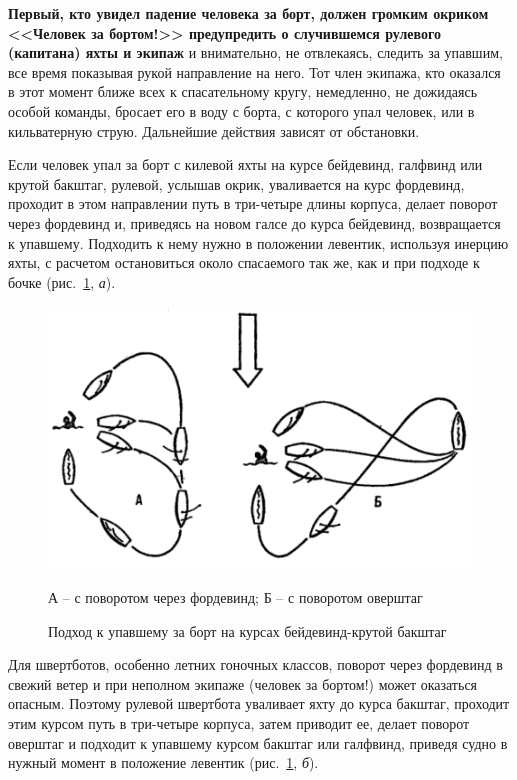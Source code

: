 \documentclass[a4paper, 12pt, twoside, final]{scrbook}
\begin{document}
\textbf{Первый, кто увидел падение человека за борт, должен громким окриком <<Человек за бортом!>> предупредить о случившемся рулевого (капитана) яхты и экипаж} и внимательно, не отвлекаясь, следить за упавшим, все время показывая рукой направление на него. Тот член экипажа, кто оказался в этот момент ближе всех к спасательному кругу, немедленно, не дожидаясь особой команды, бросает его в воду с борта, с которого упал человек, или в кильватерную струю. Дальнейшие действия зависят от обстановки.

Если человек упал за борт с килевой яхты на курсе бейдевинд, галфвинд или крутой бакштаг, рулевой, услышав окрик, уваливается на курс фордевинд, проходит в этом направлении путь в три\--четыре длины корпуса, делает поворот через фордевинд и, приведясь на новом галсе до курса бейдевинд, возвращается к упавшему. Подходить к нему нужно в положении левентик, используя инерцию яхты, с расчетом остановиться около спасаемого так же, как и при подходе к бочке (рис.~\ref{fig:134}, \textit{а}). 

\begin{figure}[htbp]
   \centering
   \includegraphics{pics/134_Podhod_upavshemu_za_bort} %
   \caption{Подход к упавшему за борт на курсах бейдевинд\--крутой бакштаг}
   \label{fig:134}
   \centering\small
   А \--- с поворотом через фордевинд; Б \--- с поворотом оверштаг
\end{figure}

Для швертботов, особенно летних гоночных классов, поворот через фордевинд в свежий ветер и при неполном экипаже (человек за бортом!) может оказаться опасным. Поэтому рулевой швертбота уваливает яхту до курса бакштаг, проходит этим курсом путь в три-четыре корпуса, затем приводит ее, делает поворот оверштаг и подходит к упавшему курсом бакштаг или галфвинд, приведя судно в нужный момент в положение левентик (рис.~\ref{fig:134}, \textit{б}). 
\end{document}

